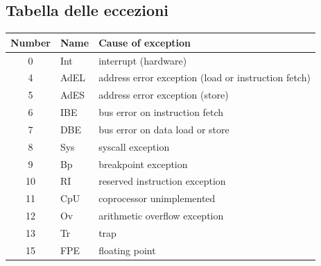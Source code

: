 \subsection{Tabella delle eccezioni}
\begin{center}
    \begin{tabular}{|c|l|l|}
    \hline
    \textbf{Number} & \textbf{Name} & \textbf{Cause of exception} \\
    \hline
    0 & Int & interrupt (hardware) \\
    \hline
    4 & AdEL & address error exception (load or instruction fetch) \\
    \hline
    5 & AdES & address error exception (store) \\
    \hline
    6 & IBE & bus error on instruction fetch \\
    \hline
    7 & DBE & bus error on data load or store \\
    \hline
    8 & Sys & syscall exception \\
    \hline
    9 & Bp & breakpoint exception \\
    \hline
    10 & RI & reserved instruction exception \\
    \hline
    11 & CpU & coprocessor unimplemented \\
    \hline
    12 & Ov & arithmetic overflow exception \\
    \hline
    13 & Tr & trap \\
    \hline
    15 & FPE & floating point \\
    \hline
    \end{tabular}
\end{center}